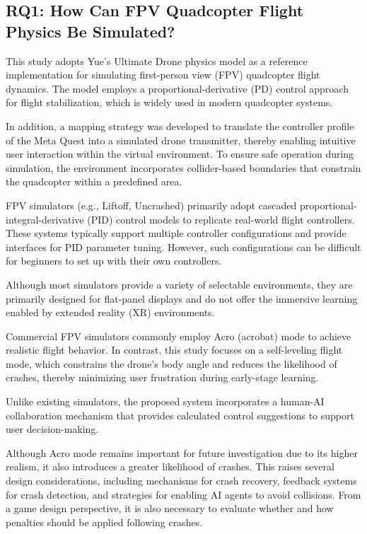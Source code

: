 \subsection{RQ1: How Can FPV Quadcopter Flight Physics Be Simulated?}

This study adopts Yue's Ultimate Drone physics model \parencite{yuetility2022fpvphysics} as a reference implementation for simulating first-person view (FPV) quadcopter flight dynamics. The model employs a proportional-derivative (PD) control approach for flight stabilization, which is widely used in modern quadcopter systems.

In addition, a mapping strategy was developed to translate the controller profile of the Meta Quest into a simulated drone transmitter, thereby enabling intuitive user interaction within the virtual environment. To ensure safe operation during simulation, the environment incorporates collider-based boundaries that constrain the quadcopter within a predefined area.

FPV simulators (e.g., Liftoff, Uncrashed) primarily adopt cascaded proportional-integral-derivative (PID) control models to replicate real-world flight controllers. These systems typically support multiple controller configurations and provide interfaces for PID parameter tuning. However, such configurations can be difficult for beginners to set up with their own controllers.

Although most simulators provide a variety of selectable environments, they are primarily designed for flat-panel displays and do not offer the immersive learning enabled by extended reality (XR) environments.

Commercial FPV simulators commonly employ Acro (acrobat) mode to achieve realistic flight behavior. In contrast, this study focuses on a self-leveling flight mode, which constrains the drone's body angle and reduces the likelihood of crashes, thereby minimizing user frustration during early-stage learning.

Unlike existing simulators, the proposed system incorporates a human-AI collaboration mechanism that provides calculated control suggestions to support user decision-making.

Although Acro mode remains important for future investigation due to its higher realism, it also introduces a greater likelihood of crashes. This raises several design considerations, including mechanisms for crash recovery, feedback systems for crash detection, and strategies for enabling AI agents to avoid collisions. From a game design perspective, it is also necessary to evaluate whether and how penalties should be applied following crashes.
